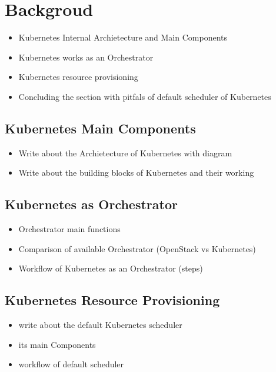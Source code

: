 \section{Backgroud}
\label{sec:backgroud}
\begin{itemize}
  \item Kubernetes Internal Archietecture and Main Components
  \item Kubernetes works as an Orchestrator
  \item Kubernetes resource provisioning
  \item Concluding the section with pitfals of default scheduler of Kubernetes
\end{itemize}

\subsection{Kubernetes Main Components}
\label{sec:k8s_main_comp}
\begin{itemize}
  \item Write about the Archietecture of Kubernetes with diagram
  \item Write about the building blocks of Kubernetes and their working
\end{itemize}

\subsection{Kubernetes as Orchestrator}
\label{sec:k8s_orchestrator}
\begin{itemize}
  \item Orchestrator main functions
  \item Comparison of available Orchestrator (OpenStack vs Kubernetes)
  \item Workflow of Kubernetes as an Orchestrator (steps)
\end{itemize}

\subsection{Kubernetes Resource Provisioning}
\label{sec:k8s_scheduler}
\begin{itemize}
  \item write about the default Kubernetes scheduler
  \item its main Components
  \item workflow of default scheduler
\end{itemize}

